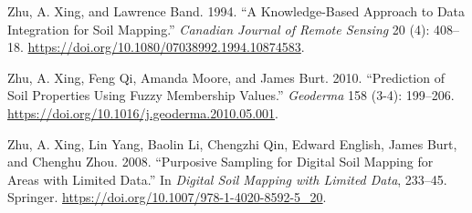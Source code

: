 \begin{CSLReferences}{1}{0}
\leavevmode{}%
Zhu, A. Xing, and Lawrence Band. 1994. {``A Knowledge-Based Approach to Data Integration for Soil Mapping.''} \emph{Canadian Journal of Remote Sensing} 20 (4): 408--18. \url{https://doi.org/10.1080/07038992.1994.10874583}.

\leavevmode{}%
Zhu, A. Xing, Feng Qi, Amanda Moore, and James Burt. 2010. {``Prediction of Soil Properties Using Fuzzy Membership Values.''} \emph{Geoderma} 158 (3-4): 199--206. \url{https://doi.org/10.1016/j.geoderma.2010.05.001}.

\leavevmode{}%
Zhu, A. Xing, Lin Yang, Baolin Li, Chengzhi Qin, Edward English, James Burt, and Chenghu Zhou. 2008. {``Purposive Sampling for Digital Soil Mapping for Areas with Limited Data.''} In \emph{Digital Soil Mapping with Limited Data}, 233--45. Springer. \url{https://doi.org/10.1007/978-1-4020-8592-5_20}.

\end{CSLReferences}



\address{%
Bryan A. Fuentes\\
University of Arkansas\\%
Department of Crop, Soil, and Environmental Sciences\\ Fayetteville, Arkansas\\
%
%
\textit{ORCiD: \href{https://orcid.org/0000-0003-3506-7101}{0000-0003-3506-7101}}\\%
\href{mailto:bafuente@uark.edu}{\nolinkurl{bafuente@uark.edu}}%
}

\address{%
Minerva J. Dorantes\\
University of Arkansas\\%
Department of Crop, Soil, and Environmental Sciences\\ Fayetteville, Arkansas\\
%
%
\textit{ORCiD: \href{https://orcid.org/0000-0002-2877-832X}{0000-0002-2877-832X}}\\%
\href{mailto:mjdorant@uark.edu}{\nolinkurl{mjdorant@uark.edu}}%
}

\address{%
John R. Tipton\\
University of Arkansas\\%
Department of Mathematical Sciences\\ Fayetteville, Arkansas\\
%
%
\textit{ORCiD: \href{https://orcid.org/0000-0002-6135-8141}{0000-0002-6135-8141}}\\%
\href{mailto:jrtipton@uark.edu}{\nolinkurl{jrtipton@uark.edu}}%
}

